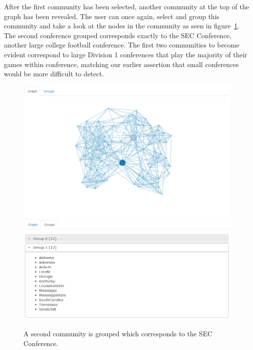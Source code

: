\documentclass{article}\usepackage[]{graphicx}\usepackage[]{color}
\begin{document}
After the first community has been selected, another community at the top of the graph has been revealed. The user can once again, select and group this community and take a look at the nodes in the community as seen in figure~\ref{fig:football_6}. The second conference grouped corresponds exactly to the SEC Conference, another large college football conference. The first two communities to become evident correspond to large Division 1 conferences that play the majority of their games within conference, matching our earlier assertion that small conferences would be more difficult to detect.

\begin{figure}[H]
\centering
\includegraphics[width=\textwidth]{images/football_6.png}
\includegraphics[width=\textwidth]{images/football_7.png}
\caption{\label{fig:football_6} A second community is grouped which corresponds to the SEC Conference.}
\end{figure}
\end{document}
